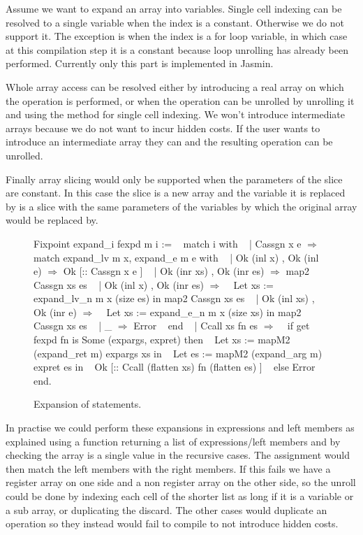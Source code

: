 \documentclass{article}
\begin{document}
Assume we want to expand an array into variables. Single cell indexing can be
resolved to a single variable when the index is a constant. Otherwise we do not
support it. The exception is when the index is a for loop variable, in which
case at this compilation step it is a constant because loop unrolling has
already been performed.
Currently only this part is implemented in Jasmin.

Whole array access can be resolved either by introducing a real array on which
the operation is performed, or when the operation can be unrolled by unrolling
it and using the method for single cell indexing. We won't introduce
intermediate arrays because we do not want to incur hidden costs. If the user
wants to introduce an intermediate array they can and the resulting operation
can be unrolled.

Finally array slicing would only be supported when the parameters of the slice
are constant. In this case the slice is a new array and the variable it is
replaced by is a slice with the same parameters of the variables by which the
original array would be replaced by.

\smallskip

\begin{figure}[t]
\obeylines\obeyspaces\ttfamily%
Fixpoint expand\_i fexpd m i :=
~ match i with
~ | Cassgn x e \(\Rightarrow\)
~   match expand\_lv m x, expand\_e m e     with
~   | Ok (inl x)       , Ok (inl e)       \(\Rightarrow\) Ok [:: Cassgn x e ]
~   | Ok (inr xs)      , Ok (inr es)      \(\Rightarrow\) map2 Cassgn xs es
~   | Ok (inl x)       , Ok (inr es)      \(\Rightarrow\)
~     Let xs := expand\_lv\_n m x (size es) in map2 Cassgn xs es
~   | Ok (inl xs)      , Ok (inr e)       \(\Rightarrow\)
~     Let xs := expand\_e\_n  m x (size xs) in map2 Cassgn xs es
~   | \_                                   \(\Rightarrow\) Error
~   end
~ | Ccall xs fn es \(\Rightarrow\)
~   if get fexpd fn is Some (expargs, expret) then
~     Let xs := mapM2 (expand\_ret m) expargs xs in
~     Let es := mapM2 (expand\_arg m) expret  es in
~     Ok [:: Ccall (flatten xs) fn (flatten es) ]
~   else Error
~ end.
\normalfont%
\caption{Expansion of statements.}
\end{figure}

In practise we could perform these expansions in expressions and left members
as explained using a function returning a list of expressions/left members and
by checking the array is a single value in the recursive cases. The assignment
would then match the left members with the right members. If this fails we have
a register array on one side and a non register array on the other side, so the
unroll could be done by indexing each cell of the shorter list as long if it is
a variable or a sub array, or duplicating the discard. The other cases would
duplicate an operation so they instead would fail to compile to not introduce
hidden costs.
\end{document}
